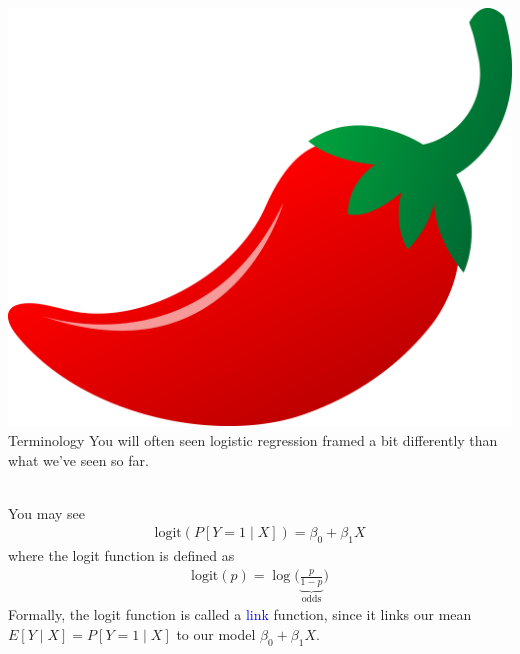 \documentclass[10pt,t]{beamer}
\begin{document}
\begin{frame}{\includegraphics[scale=0.01]{./figs/chilipepper} Terminology}
	You will often seen logistic regression framed a bit differently than what we've seen so far. \pause
	\\ ~\ 
	
	You may see
	\begin{align*}
		\text{logit}(P[Y = 1 \mid X]) = \beta_0 + \beta_1 X
	\end{align*}
	where the logit function is defined as \pause
	\begin{align*}
		\text{logit}(p) = \log\Big(\underbrace{\frac{p}{1-p}}_{\text{odds}}\Big)
	\end{align*}
	\pause
	Formally, the logit function is called a \textcolor{blue}{link} function, since it links our mean $E[Y \mid X] = P[Y = 1 \mid X]$ to our model $\beta_0 + \beta_1 X$. 
\end{frame}
\end{document}
